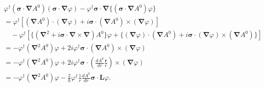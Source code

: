 \begin{align*}
  & \varphi^\dagger (\boldsymbol{\sigma} \cdot \boldsymbol{\nabla} A^0) (\boldsymbol{\sigma} \cdot \boldsymbol{\nabla} \varphi) - \varphi^\dagger \boldsymbol{\sigma} \cdot \boldsymbol{\nabla} \{(\boldsymbol{\sigma} \cdot \boldsymbol{\nabla} A^0) \varphi\} \\
  & = \varphi^\dagger[(\boldsymbol{\nabla} A^0) \cdot (\boldsymbol{\nabla} \varphi) + i\boldsymbol{\sigma} \cdot (\boldsymbol{\nabla} A^0) \times (\boldsymbol{\nabla} \varphi)] \\
  & \quad - \varphi^\dagger[\{(\boldsymbol{\nabla}^2 + i\boldsymbol{\sigma} \cdot \boldsymbol{\nabla} \times \boldsymbol{\nabla}) A^0\}\varphi + \{(\boldsymbol{\nabla} \varphi) \cdot (\boldsymbol{\nabla} A^0) + i\boldsymbol{\sigma} \cdot (\boldsymbol{\nabla} \varphi) \times (\boldsymbol{\nabla} A^0)\}] \\
  & = -\varphi^\dagger (\boldsymbol{\nabla}^2 A^0)\varphi + 2i\varphi^\dagger \boldsymbol{\sigma} \cdot (\boldsymbol{\nabla} A^0) \times (\boldsymbol{\nabla} \varphi) \\
  & = -\varphi^\dagger (\boldsymbol{\nabla}^2 A^0)\varphi + 2i\varphi^\dagger \boldsymbol{\sigma} \cdot \left(\frac{dA^0}{dr} \frac{\boldsymbol{r}}{r}\right) \times (\boldsymbol{\nabla} \varphi) \\
  & = -\varphi^\dagger (\boldsymbol{\nabla}^2 A^0)\varphi - \frac{2}{\hbar} \varphi^\dagger \frac{1}{r} \frac{dA^0}{dr} \boldsymbol{\sigma} \cdot \boldsymbol{L} \varphi.
\end{align*}
